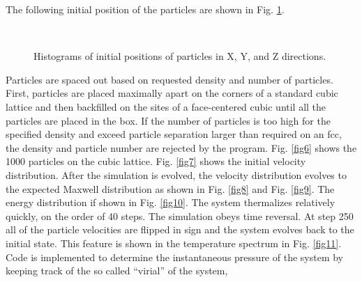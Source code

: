 \documentclass[singlepage,notitlepage,nofootinbib,11pt]{revtex4-1}
\begin{document}
The following initial position of the particles are shown in Fig. \ref{fig5}.
\begin{figure}[]
  \captionsetup[subfigure]{labelformat=empty}
  \centering
  \\
\hfill
  \caption{\label{fig5} Histograms of initial positions of particles in X, Y, and Z directions.}
\end{figure}
Particles are spaced out based on requested density and number of particles. First, particles are placed maximally apart on the corners of a standard cubic lattice and then backfilled on the sites of a face-centered cubic until all the particles are placed in the box. If the number of particles is too high for the specified density and exceed particle separation larger than required on an fcc, the density and particle number are rejected by the program. Fig. \ref{fig6} shows the 1000 particles on the cubic lattice. Fig. \ref{fig7} shows the initial velocity distribution. After the simulation is evolved, the velocity distribution evolves to the expected Maxwell distribution as shown in Fig. \ref{fig8} and Fig. \ref{fig9}. The energy distribution if shown in Fig. \ref{fig10}. The system thermalizes relatively quickly, on the order of 40 steps. The simulation obeys time reversal. At step 250 all of the particle velocities are flipped in sign and the system evolves back to the initial state. This feature is shown in the temperature spectrum in Fig. \ref{fig11}. Code is implemented to determine the instantaneous pressure of the system by keeping track of the so called ``virial'' of the system, 
\end{document}
